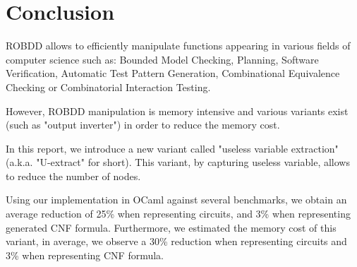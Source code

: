 \documentclass[a4paper,10pt]{article}
\begin{document}
\section{Conclusion}

ROBDD allows to efficiently manipulate functions appearing in various fields of computer science such as: Bounded Model Checking, Planning, Software Verification, Automatic Test Pattern Generation, Combinational Equivalence Checking or Combinatorial Interaction Testing.

However, ROBDD manipulation is memory intensive and various variants exist (such as "output inverter") in order to reduce the memory cost.

In this report, we introduce a new variant called "useless variable extraction" (a.k.a. "U-extract" for short).
This variant, by capturing useless variable, allows to reduce the number of nodes.


Using our implementation in OCaml against several benchmarks, we obtain an average reduction of 25\% when representing circuits, and 3\% when representing generated CNF formula.
Furthermore, we estimated the memory cost of this variant, in average, we observe a 30\% reduction when representing circuits and 3\% when representing CNF formula.


\newpage
{}

\end{document}
